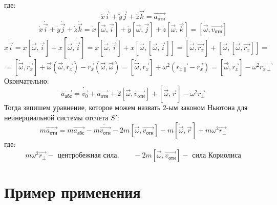 \documentclass[a4paper, 12pt]{article}
\begin{document}
где:
\[ \ddot{x}\overrightarrow{i} + \ddot{y}\overrightarrow{j} + \ddot{z}\overrightarrow{k} = \overrightarrow{a_{отн}}\]
\[ \dot{x}\dot{\overrightarrow{i}} + \dot{y}\dot{\overrightarrow{j}} + \dot{z}\dot{\overrightarrow{k}} = \dot{x}[\overrightarrow{\omega}, \overrightarrow{i} ] + \dot{y}[\overrightarrow{\omega}, \overrightarrow{j} ] + \dot{z}[\overrightarrow{\omega}, \overrightarrow{k} ] = [\overrightarrow{\omega}, \overrightarrow{v_{отн}}] \]
\[ x\ddot{\overrightarrow{i}} = x[\dot{\overrightarrow{\omega}}, \overrightarrow{i} ] + x[\overrightarrow{\omega}, \dot{\overrightarrow{i}} ] = x[\dot{\overrightarrow{\omega}}, \overrightarrow{i} ] + x[\overrightarrow{\omega}, [\overrightarrow{\omega}, \overrightarrow{i}] ] = [\dot{\overrightarrow{\omega}}, \overrightarrow{r_x} ] + [\overrightarrow{\omega}, [\overrightarrow{\omega}, \overrightarrow{r_x}] ] = \]
\[ = [\dot{\overrightarrow{\omega}}, \overrightarrow{r_x} ] + \overrightarrow{\omega}( \overrightarrow{\omega}, \overrightarrow{r_x}) - \overrightarrow{r_x}( \overrightarrow{\omega}, \overrightarrow{\omega} ) = [\dot{\overrightarrow{\omega}}, \overrightarrow{r_x} ] + \omega^2(\overrightarrow{r_{x\parallel}} - \overrightarrow{r_x} ) = [\dot{\overrightarrow{\omega}}, \overrightarrow{r_x} ] - \omega^2 \overrightarrow{r_{x\perp}}  \]
Окончательно:
\[ \overrightarrow{a_{абс}} = \dot{\overrightarrow{v_0}} + \overrightarrow{a_{отн}} + 2[\overrightarrow{\omega}, \overrightarrow{v_{отн}}] + [\dot{\overrightarrow{\omega}}, \overrightarrow{r}] - \omega^2\overrightarrow{r_{\perp}}\]
Тогда звпишем уравнение, которое можем назвать 2-ым законом Ньютона для неинерциальной системы отсчета $S'$:
\[ m\overrightarrow{a_{отн}} = m\overrightarrow{a_{абс}} - m\dot{\overrightarrow{v_{отн}}} - 2m[\overrightarrow{\omega}, \overrightarrow{v_{отн}}] - m [\dot{\overrightarrow{\omega}}, \overrightarrow{r}] + m\omega^2\overrightarrow{r_{\perp}}\]
где:
\[ m\omega^2\overrightarrow{r_{\perp}} - \text{ центробежная сила,} \qquad -2m[\overrightarrow{\omega}, \overrightarrow{v_{отн}}] - \text{ сила Кориолиса}\]
\section{Пример применения}
\end{document}

